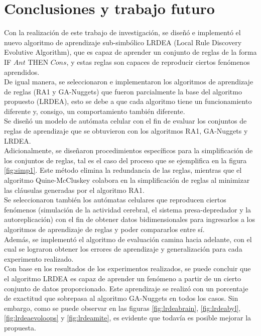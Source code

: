 \chapter{Conclusiones y trabajo futuro}

Con la realización de este trabajo de investigación, se diseñó e implementó el nuevo algoritmo de aprendizaje sub-simbólico LRDEA (Local Rule Discovery Evolutive Algorithm), que es capaz de aprender un conjunto de reglas de la forma IF $Ant$ THEN $Cons$, y estas reglas son capaces de reproducir ciertos fenómenos aprendidos.
\\

De igual manera, se seleccionaron e implementaron los algoritmos de aprendizaje de reglas (RA1 y GA-Nuggets) que fueron parcialmente la base del algoritmo propuesto (LRDEA), esto se debe a que cada algoritmo tiene un funcionamiento diferente y, consigo, un comportamiento también diferente.
\\

Se diseñó un modelo de autómata celular con el fin de evaluar los conjuntos de reglas de aprendizaje que se obtuvieron con los algoritmos RA1, GA-Nuggets y LRDEA.
\\

Adicionalmente, se diseñaron procedimientos específicos para la simplificación de los conjuntos de reglas, tal es el caso del proceso que se ejemplifica en la figura \ref{fig:simp1}. Este método elimina la redundancia de las reglas, mientras que el algoritmo Quine-McCluskey colabora en la simplificación de reglas al minimizar las cláusulas generadas por el algoritmo RA1.
\\

Se seleccionaron también los autómatas celulares que reproducen ciertos fenómenos (simulación de la actividad cerebral, el sistema presa-depredador y la autoreplicación) con el fin de obtener datos bidimensionales para ingresarlos a los algoritmos de aprendizaje de reglas y poder compararlos entre sí.
\\

Además, se implementó el algoritmo de evaluación camina hacia adelante, con el cual se lograron obtener los errores de aprendizaje y generalización para cada experimento realizado.
\\

Con base en los resultados de los experimentos realizados, se puede concluir que el algoritmo LRDEA es capaz de aprender un fenómeno a partir de un cierto conjunto de datos proporcionado. Este aprendizaje se realizó con un porcentaje de exactitud que sobrepasa al algoritmo GA-Nuggets en todos los casos. Sin embargo, como se puede observar en las figuras \ref{fig:lrdeabrain}, \ref{fig:lrdeabyl}, \ref{fig:lrdeaevoloops} y \ref{fig:lrdeamite}, es evidente que todavía es posible mejorar la propuesta.
\\


